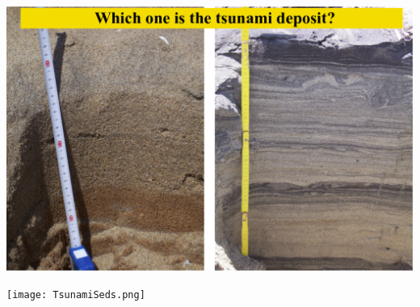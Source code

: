 \documentclass{beamer}
\begin{document}
\begin{frame}[t]
\begin{center}
  \vspace*{3.5em} \includegraphics[scale=0.20]{TsuSed_coverd.png} \\
\end{center}
\end{frame}

\begin{frame}[t]
\begin{center}
  \vspace*{3.5em} \texttt{[image: TsunamiSeds.png]} \\
\end{center}
\end{frame}
\end{document}

